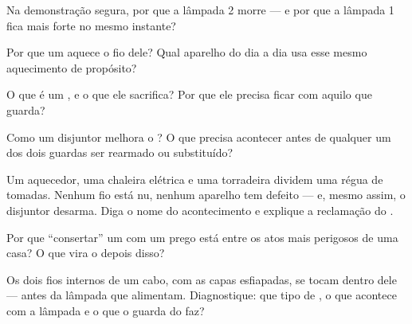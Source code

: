 \begin{exercise}[$\star$]\label{exo:g7:short-circuits-safety:3}
Na demonstração segura, por que a lâmpada 2 morre --- e por que a
lâmpada 1 fica mais forte no mesmo instante?
\end{exercise}

\begin{exercise}[$\star$]\label{exo:g7:short-circuits-safety:4}
Por que um  aquece o fio dele? Qual aparelho do dia a
dia usa esse mesmo aquecimento de propósito?
\end{exercise}

\begin{exercise}[$\star$]\label{exo:g7:short-circuits-safety:5}
O que é um , e o que ele sacrifica? Por que ele precisa ficar
 com aquilo que guarda?
\end{exercise}

\begin{exercise}[$\star$]\label{exo:g7:short-circuits-safety:6}
Como um disjuntor melhora o ? O que precisa acontecer antes de
qualquer um dos dois guardas ser rearmado ou substituído?
\end{exercise}

\begin{exercise}[$\star$]\label{exo:g7:short-circuits-safety:7}
Um aquecedor, uma chaleira elétrica e uma torradeira dividem uma
régua de tomadas. Nenhum fio está nu, nenhum aparelho tem defeito ---
e, mesmo assim, o disjuntor desarma. Diga o nome do acontecimento e
explique a reclamação do .
\end{exercise}

\begin{exercise}[$\star$]\label{exo:g7:short-circuits-safety:8}
Por que ``consertar'' um  com um prego está entre os atos mais
perigosos de uma casa? O que vira o  depois disso?
\end{exercise}

\begin{exercise}[$\star\star$]\label{exo:g7:short-circuits-safety:9}
Os dois fios internos de um cabo, com as capas esfiapadas, se tocam
dentro dele --- antes da lâmpada que alimentam. Diagnostique: que
tipo de , o que acontece com a lâmpada e o que o guarda
do  faz?
\end{exercise}

